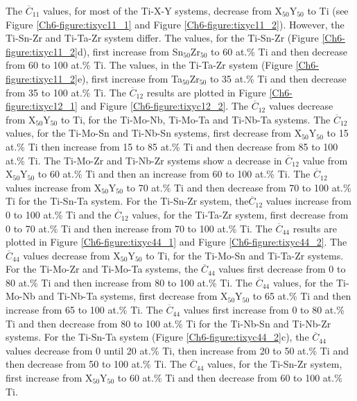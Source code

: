 The $\overline{C}_{11}$ values, for most of the Ti-X-Y systems, decrease from X$_{50}$Y$_{50}$ to Ti (see Figure \ref{Ch6-figure:tixyc11_1} and Figure \ref{Ch6-figure:tixyc11_2}). However, the Ti-Sn-Zr and Ti-Ta-Zr system differ. The  values, for the Ti-Sn-Zr (Figure \ref{Ch6-figure:tixyc11_2}d), first increase from Sn$_{50}$Zr$_{50}$ to 60 at.\% Ti and then decrease from 60 to 100 at.\% Ti. The  values, in the Ti-Ta-Zr system (Figure \ref{Ch6-figure:tixyc11_2}e), first increase from Ta$_{50}$Zr$_{50}$ to 35 at.\% Ti and then decrease from 35 to 100 at.\% Ti. The $\overline{C}_{12}$ results are plotted in Figure \ref{Ch6-figure:tixyc12_1} and Figure \ref{Ch6-figure:tixyc12_2}. The $\overline{C}_{12}$ values decrease from X$_{50}$Y$_{50}$ to Ti, for the Ti-Mo-Nb, Ti-Mo-Ta and Ti-Nb-Ta systems. The $\overline{C}_{12}$ values, for the Ti-Mo-Sn and Ti-Nb-Sn systems, first decrease from X$_{50}$Y$_{50}$ to 15 at.\% Ti then increase from 15 to 85 at.\% Ti and then decrease from 85 to 100 at.\% Ti. The Ti-Mo-Zr and Ti-Nb-Zr systems show a decrease in $\overline{C}_{12}$ value from X$_{50}$Y$_{50}$ to 60 at.\% Ti and then an increase from 60 to 100 at.\% Ti. The $\overline{C}_{12}$ values increase from X$_{50}$Y$_{50}$ to 70 at.\% Ti and then decrease from 70 to 100 at.\% Ti for the Ti-Sn-Ta system. For the Ti-Sn-Zr system, the$\overline{C}_{12}$ values increase from 0 to 100 at.\% Ti and the $\overline{C}_{12}$ values, for the Ti-Ta-Zr system, first decrease from 0 to 70 at.\% Ti and then increase from 70 to 100 at.\% Ti. The $\overline{C}_{44}$ results are plotted in Figure \ref{Ch6-figure:tixyc44_1} and Figure \ref{Ch6-figure:tixyc44_2}. The $\overline{C}_{44}$ values decrease from X$_{50}$Y$_{50}$ to Ti, for the Ti-Mo-Sn and Ti-Ta-Zr systems. For the Ti-Mo-Zr and Ti-Mo-Ta systems, the $\overline{C}_{44}$ values first decrease from 0 to 80 at.\% Ti and then increase from 80 to 100 at.\% Ti. The $\overline{C}_{44}$ values, for the Ti-Mo-Nb and Ti-Nb-Ta systems, first decrease from X$_{50}$Y$_{50}$ to 65 at.\% Ti and then increase from 65 to 100 at.\% Ti. The $\overline{C}_{44}$ values first increase from 0 to 80 at.\% Ti and then decrease from 80 to 100 at.\% Ti for the Ti-Nb-Sn and Ti-Nb-Zr systems. For the Ti-Sn-Ta system (Figure \ref{Ch6-figure:tixyc44_2}c), the $\overline{C}_{44}$ values decrease from 0 until 20 at.\% Ti, then increase from 20 to 50 at.\% Ti and then decrease from 50 to 100 at.\% Ti. The $\overline{C}_{44}$ values, for the Ti-Sn-Zr system, first increase from X$_{50}$Y$_{50}$ to 60 at.\% Ti and then decrease from 60 to 100 at.\% Ti.

